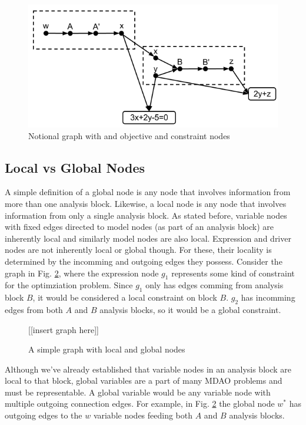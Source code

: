 \begin{figure}[htb!]
  \begin{center}
    \includegraphics[width=.6\textwidth]{images/obj_const_graph}
  \end{center}
  \caption{Notional graph with and objective and constraint nodes \label{f:obj-cons}}
\end{figure}


\subsection{Local vs Global Nodes}

  A simple definition of a global node is any node that involves information 
  from more than one analysis block. Likewise, a local node is any node 
  that involves information from only a single analysis block. As stated before, variable 
  nodes with fixed edges directed to model nodes (as part of an analysis block) are inherently local 
  and similarly model nodes are also local. Expression and driver nodes
  are not inherently local or global though. For these, their locality is determined 
  by the incomming and outgoing edges they possess. Consider the graph in Fig. \ref{f:local_global}, 
  where the expression node $g_1$ represents some kind of constraint for the optimziation problem. 
  Since $g_1$ only has edges comming from analysis block $B$, it would be considered a local constraint 
  on block $B$. $g_2$ has incomming edges from both $A$ and $B$ analysis blocks, so it would be a global constraint. 

  \begin{figure}
      \begin{center}
      [[insert graph here]]
      \caption{A simple graph with local and global nodes \label{f:local_global}}
      \end{center}
  \end{figure}

  Although we've already established that variable nodes in an analysis block are local to that 
  block, global variables are a part of many MDAO problems and must be representable. A global variable 
  would be any variable node with multiple outgoing connection edges. 
  For example, in Fig. \ref{f:local_global} the global node $w^*$ has outgoing edges to 
  the $w$ variable nodes feeding both $A$ and $B$ analysis blocks.

